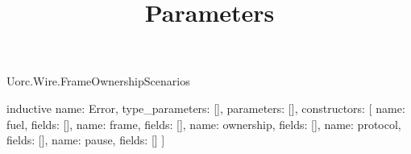 \begin{lexlean}{Uorc.Wire.FrameOwnershipScenarios}
\title{Parameters}
\begin{semanticmodule}
inductive{
  name: Error,
  type_parameters: [],
  parameters: [],
  constructors: [
    {name: fuel, fields: []},
    {name: frame, fields: []},
    {name: ownership, fields: []},
    {name: protocol, fields: []},
    {name: pause, fields: []}
  ]
}


\end{semanticmodule}
\end{lexlean}
